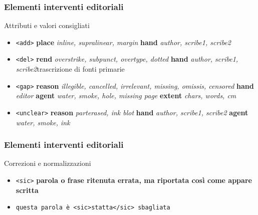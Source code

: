 \begin{frame}
    \frametitle{Elementi interventi editoriali}
    \addtocounter{nframe}{1}
    

    \begin{block}{Attributi e valori consigliati}
        \begin{itemize}
            \item \texttt{<add>} \textbf{place} \textit{inline, supralinear, margin} \textbf{hand} \textit{author, scribe1, scribe2}
            \item \texttt{<del>} \textbf{rend} \textit{overstrike, subpunct, overtype, dotted} \textbf{hand} \textit{author, scribe1, scribe2}trascrizione di fonti primarie 
            \item \texttt{<gap>} \textbf{reason} \textit{illegible, cancelled, irrelevant, missing, omissis, censored} \textbf{hand} \textit{editor} \textbf{agent} \textit{water, smoke, hole, missing page} \textbf{extent} \textit{chars, words, cm}
            \item \texttt{<unclear>} \textbf{reason} \textit{parterased, ink blot} \textbf{hand} \textit{author, scribe1, scribe2} \textbf{agent} \textit{water, smoke, ink}
        \end{itemize}
    \end{block}
    
\end{frame}

\begin{frame}
    \frametitle{Elementi interventi editoriali}
    \addtocounter{nframe}{1}
    

    \begin{block}{Correzioni e normalizzazioni}
        \begin{itemize}
            \item \texttt{<sic>} \textbf{parola o frase ritenuta errata, ma riportata così come appare scritta}
            \item[] \texttt{questa parola è <sic>statta</sic> sbagliata}
        \end{itemize}
        
    \end{block}
    
\end{frame}

